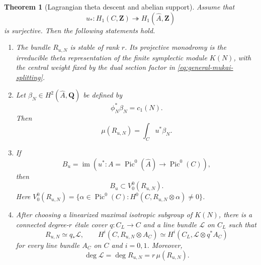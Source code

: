\documentclass[11pt,reqno]{amsart}
\numberwithin{equation}{section}
\newtheorem{theorem}{Theorem}[section]
\theoremstyle{remark}
\DeclareMathOperator{\Pic}{Pic}
\DeclareMathOperator{\im}{im}
\newcommand{\bZ}{\mathbf Z}
\newcommand{\bQ}{\mathbf Q}
\begin{document}
\begin{theorem}[Lagrangian theta descent and abelian support]\label{thm:abelian-block}
Assume that
\[
 u_*\colon H_1(C,\bZ)\twoheadrightarrow H_1(\widehat A,\bZ)
\tag{8.3}\label{eq:H1-surjective}
\]
is surjective.  Then the following statements hold.
\begin{enumerate}[label=\textup{(\roman*)}]
\item The bundle \(R_{u,N}\) is stable of rank \(r\).  Its projective
monodromy is the irreducible theta representation of the finite
symplectic module \(K(N)\), with the central weight fixed by the dual
section factor in \eqref{eq:general-mukai-splitting}.
\item Let \(\beta_N\in H^2(\widehat A,\bQ)\) be defined by
\[
 \phi_N^*\beta_N=c_1(N).
\tag{8.4}\label{eq:beta-definition}
\]
Then
\[
 \mu(R_{u,N})=\int_Cu^*\beta_N.
\tag{8.5}\label{eq:general-slope}
\]
\item If
\[
 B_u=\im\!\left(
 u^*\colon A=\Pic^0(\widehat A)\longrightarrow\Pic^0(C)\right),
\tag{8.6}\label{eq:Bu}
\]
then
\[
 B_u\subset V_0^0(R_{u,N}).
\tag{8.7}\label{eq:abelian-support}
\]
Here
\(V_0^0(R_{u,N})=\{\alpha\in\Pic^0(C):
H^0(C,R_{u,N}\otimes\alpha)\neq0\}\).
\item After choosing a linearized maximal isotropic subgroup of
\(K(N)\), there is a connected degree-\(r\) \'etale cover
\(q\colon C_L\to C\) and a line bundle \(\mathcal L\) on \(C_L\) such
that
\[
 R_{u,N}\simeq q_*\mathcal L,\qquad
 H^i(C,R_{u,N}\otimes A_C)
 \simeq H^i(C_L,\mathcal L\otimes q^*A_C)
\tag{8.8}\label{eq:general-line-descent}
\]
for every line bundle \(A_C\) on \(C\) and \(i=0,1\).  Moreover,
\[
 \deg\mathcal L=\deg R_{u,N}
 =r\,\mu(R_{u,N}).
\tag{8.9}\label{eq:line-degree}
\]
\end{enumerate}
\end{theorem}
\end{document}

